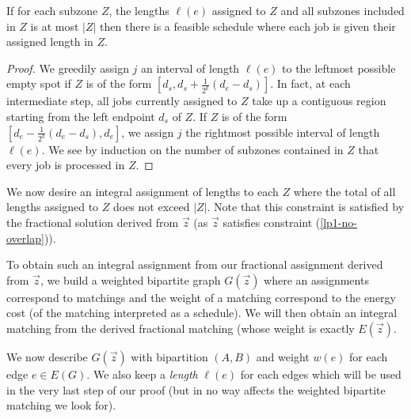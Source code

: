 \begin{lem}\label{lemma:earliest_deadline_first}
  If for each subzone $Z$, the lengths $\ell(e)$ assigned to $Z$ and all subzones included in $Z$ is at most $|Z|$ then there is a feasible schedule where each job is given their assigned length in $Z$.
\end{lem}
\begin{proof}
We greedily assign $j$ an interval of length $\ell(e)$ to the leftmost possible empty spot if $Z$ is of the form $[d_s, d_s + \frac{1}{2^{k}}(d_e-d_s) ]$. In fact, at each intermediate step, all jobs currently assigned to $Z$ take up a contiguous region starting from the left endpoint $d_s$ of $Z$. If $Z$ is of the form $[d_e - \frac{1}{2^{k}}(d_e-d_s), d_e ]$, we assign $j$ the rightmost possible interval of length $\ell(e)$.
We see by induction on the number of subzones contained in $Z$ that every job is processed in $Z$.
\end{proof}



We now desire an integral assignment of lengths to each $Z$ where the total of all lengths assigned to $Z$ does not exceed $|Z|$. Note that this constraint is satisfied by the fractional solution derived from $\vec{z}$ (as $\vec{z}$ satisfies constraint (\ref{lp1-no-overlap})).

To obtain such an integral assignment from our fractional assignment derived from $\vec{z}$, we build a weighted bipartite graph $G(\vec{z})$ where an assignments correspond to matchings and the weight of a matching correspond to the energy cost (of the matching interpreted as a schedule). We will then obtain an integral matching from the derived fractional matching (whose weight is exactly $E(\vec{z})$.

We now describe $G(\vec{z})$ with bipartition $(A,B)$ and weight $w(e)$ for each edge $e \in E(G)$. We also keep a \emph{length} $\ell(e)$ for each edges which will be used in the very last step of our proof (but in no way affects the weighted bipartite matching we look for).


